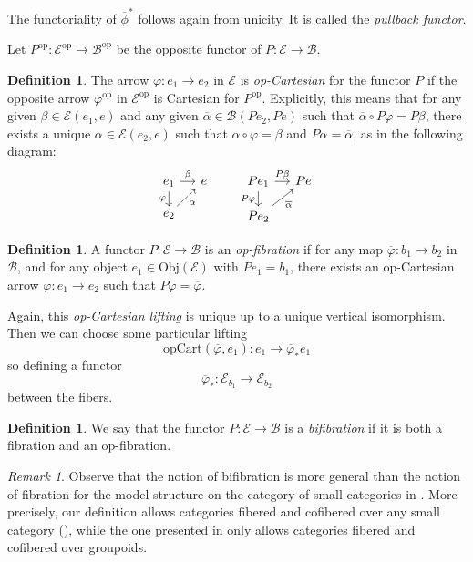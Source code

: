 \documentclass[12pt,reqno]{amsart}
\theoremstyle{definition}
\newtheorem{defi}[teo]{Definition}
\theoremstyle{remark}
\newtheorem{rem}[teo]{Remark}
\numberwithin{figure}{section}%
\newcommand{\Ba}{\mathcal{B}}
\newcommand{\bbar}{\overline}
\newcommand{\E}{\mathcal{E}}
\newcommand{\op}{\mathrm{op}}
\newcommand{\opCart}{\mathrm{opCart}}
\begin{document}
The functoriality of ${\bbar\phi}^*$ follows again from unicity. It is called the {\em pullback functor}.


Let $P^\op \colon \E^\op \to \Ba^\op$ be the opposite functor of $P\colon \E \to \Ba$.
\begin{defi}The arrow $\varphi\colon e_1 \to e_2$ in $\E$ is {\em op-Cartesian} for the functor $P$ if the opposite arrow $\varphi^\op$ in $\E^\op$ is Cartesian for $P^\op$. Explicitly, this means that for any given $\beta\in \E(e_1,e)$ and any given $\bbar\alpha\in \Ba(Pe_2,Pe)$ such that $\bbar\alpha\circ P\varphi=P\beta$, there exists a unique $\alpha\in\E(e_2,e)$ such that $\alpha\circ\varphi=\beta$ and $P\alpha=\bbar{\alpha}$, as in the following diagram:
%
$$\begin{tikzcd}[column sep=12pt, row sep=12pt] 
e_1 \ar[d,"\varphi"']\arrow[r,"\beta"] &e \\
 e_2 \arrow[ur,dashrightarrow,"\alpha"']&  
\end{tikzcd}
\quad \quad
 \begin{tikzcd}[column sep=12pt, row sep=12pt] 
 Pe_1 \arrow[d,"P\varphi"'] \arrow[r,"P\beta"] &Pe \\
Pe_2\arrow[ur,"{\bbar\alpha}"']& 
\end{tikzcd}
$$
\end{defi}

%
\begin{defi}A functor $P\colon \E \to \Ba$ is an {\em op-fibration} if for any map $\bbar\varphi\colon b_1\to b_2$ in $\Ba$, and for any object $e_1 \in \mathrm{Obj}(\E)$ with $Pe_1=b_1$, there exists an op-Cartesian arrow $\varphi\colon e_1 \to e_2$ such that $P\varphi=\bbar\varphi$.
\end{defi}

Again, this {\em op-Cartesian lifting} is unique up to a unique vertical isomorphism. Then we can choose some particular lifting
$$\opCart(\bbar \varphi, e_1)\colon e_1 \to \bbar\varphi_*e_1$$
so defining a functor
$$\bbar\varphi_*\colon \E_{b_1} \to \E_{b_2}$$
between the fibers.


  \begin{defi}We say that the functor $P\colon \E \to \Ba$ is a {\em bifibration} if it is both a fibration and an op-fibration.
\end{defi}

\begin{rem}
    Observe that the notion of bifibration is more general than the notion of fibration for the model structure on the category of small categories  in \cite{Tanaka_model_structure}. More precisely, our definition allows categories fibered and cofibered over any small category (\cite[Proposition 3.1]{nLab2}), while the one presented in \cite{Tanaka_model_structure} only allows categories fibered and cofibered over groupoids.
\end{rem}
\end{document}
